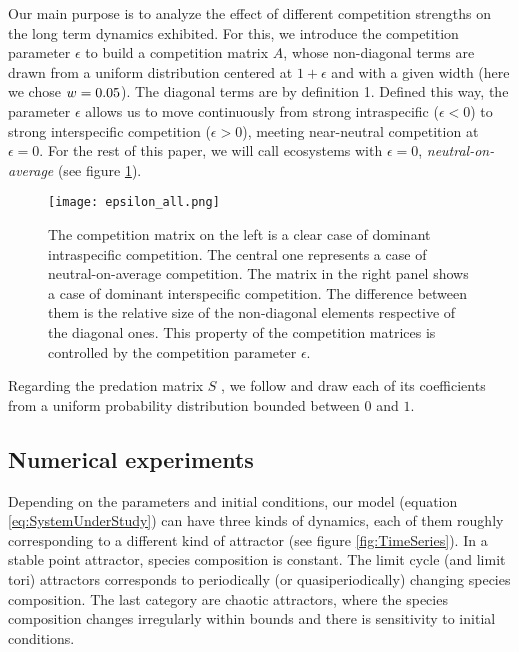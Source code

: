 Our main purpose is to analyze the effect of different competition strengths on the long term dynamics exhibited. For this, we introduce the competition parameter $\epsilon$ to build a competition matrix $A$, whose non-diagonal terms are drawn from a uniform distribution centered at $1+\epsilon$ and with a given width (here we chose $ w = 0.05$). The diagonal terms are by definition 1. Defined this way, the parameter $\epsilon$ allows us to move continuously from strong intraspecific ($ \epsilon < 0$) to strong interspecific competition ($ \epsilon > 0$), meeting near-neutral competition at $\epsilon = 0$. For the rest of this paper, we will call ecosystems with $ \epsilon = 0$, \textit{neutral-on-average} (see figure \ref{fig:CompetitionParameter}).

\begin{figure}[H]
	\begin{center}
		\texttt{[image: epsilon\_all.png]}
	\end{center}
	\caption{The competition matrix on the left is a clear case of dominant intraspecific competition. The central one represents a case of neutral-on-average competition. The matrix in the right panel shows a case of dominant interspecific competition. The difference between them is the relative size of the non-diagonal elements respective of the diagonal ones. This property of the competition matrices is controlled by the competition parameter $\epsilon$.}
	\label{fig:CompetitionParameter}
\end{figure}

Regarding the predation matrix $S$ , we follow \citet{Dakos2009b} and draw each of its coefficients from a uniform probability distribution bounded between $0$ and $1$.

\subsection{Numerical experiments}
\label{subsec:NumericalExperiment}

Depending on the parameters and initial conditions, our model (equation \eqref{eq:SystemUnderStudy}) can have three kinds of dynamics, each of them roughly corresponding to a different kind of attractor (see figure \ref{fig:TimeSeries}). In a stable point attractor, species composition is constant. The limit cycle (and limit tori) attractors corresponds to periodically (or quasiperiodically) changing species composition. The last category are chaotic attractors, where the species composition changes irregularly within bounds and there is sensitivity to initial conditions. 

